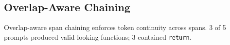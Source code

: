 \subsection{Overlap-Aware Chaining}
Overlap-aware span chaining enforces token continuity across spans.
3 of 5 prompts produced valid-looking functions; 3 contained \texttt{return}.
